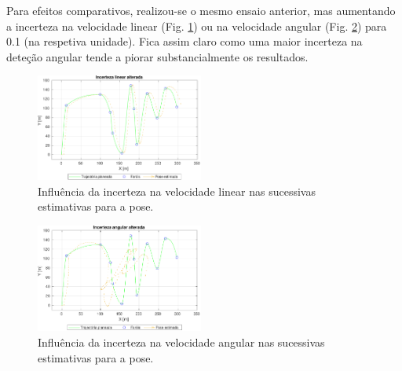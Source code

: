 \documentclass[twocolumn]{article}
\begin{document}
Para efeitos comparativos, realizou-se o mesmo ensaio anterior, mas aumentando a incerteza na velocidade linear (Fig. \ref{fig:ekf_vn0.1}) ou na velocidade angular (Fig. \ref{fig:ekf_wn0.1}) para 0.1 (na respetiva unidade). Fica assim claro como uma maior incerteza na deteção angular tende a piorar substancialmente os resultados.

\begin{figure}[ht]
    \centering
    \includegraphics[width=0.49\textwidth]{figs/ekf_vn0.1.pdf}
    \caption{Influência da incerteza na velocidade linear nas sucessivas estimativas para a pose.}
    \label{fig:ekf_vn0.1}
\end{figure}

\begin{figure}[ht]
    \centering
    \includegraphics[width=0.49\textwidth]{figs/ekf_wn0.1.pdf}
    \caption{Influência da incerteza na velocidade angular nas sucessivas estimativas para a pose.}
    \label{fig:ekf_wn0.1}
\end{figure}

\end{document}
